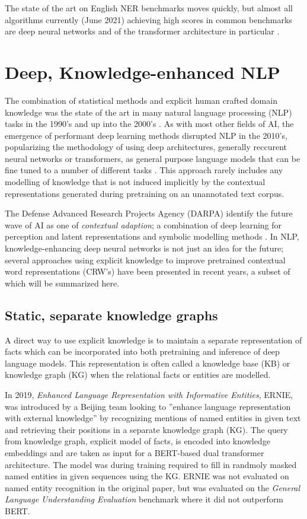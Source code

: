 \documentclass[main.tex]{subfiles}
\begin{document}
The state of the art on English NER benchmarks moves quickly, but almost all algorithms currently (June 2021) achieving high scores in common benchmarks are deep neural networks and of the transformer architecture in particular \cite{ruder21ner, pwc21ner}.

\section{Deep, Knowledge-enhanced NLP}
The combination of statistical methods and explicit human crafted domain knowledge was the state of the art in many natural language processing (NLP) tasks in the 1990's and up into the 2000's \cite[Sec. 22.5]{russell2016ai}.
As with most other fields of AI, the emergence of performant deep learning methods disrupted NLP in the 2010's, popularizing the methodology of using deep architectures, generally reccurent neural networks or transformers, as general purpose language models that can be fine tuned to a number of different tasks \cite{otter18dlnlp}.
This approach rarely includes any modelling of knowledge that is not induced implicitly by the contextual representations generated during pretraining on an unannotated text corpus.

The Defense Advanced Research Projects Agency (DARPA) identify the future wave of AI as one of \emph{contextual adaption}; a combination of deep learning for perception and latent representations and symbolic modelling methods \cite{darpa17ai}.
In NLP, knowledge-enhancing deep neural networks is not just an idea for the future; several approaches using explicit knowledge to improve pretrained contextual word representations (CRW's) have been presented in recent years, a subset of which will be summarized here.

\subsection{Static, separate knowledge graphs}
A direct way to use explicit knowledge is to maintain a separate representation of facts which can be incorporated into both pretraining and inference of deep language models.
This representation is often called a knowledge base (KB) or knowledge graph (KG) when the relational facts or entities are modelled.

In 2019, \emph{Enhanced Language Representation with Informative Entities}, ERNIE, was introduced by a Beijing team \cite{zhang2019ernie} looking to ''enhance language representation  with  external  knowledge'' \cite[1]{zhang2019ernie} by recognizing mentions of named entities in given text and retrieving their positions in a separate knowledge graph (KG).
The query from knowledge graph, explicit model of facts, is encoded into knowledge embeddings and are taken as input for a BERT-based dual transformer architecture.
The model was during training required to fill in randmoly masked named entities in given sequences using the KG.
ERNIE was not evaluated on named entity recognition in the original paper, but was evaluated on the \emph{General Language Understanding Evaluation} benchmark \cite{wang2018glue} where it did not outperform BERT.
\end{document}
